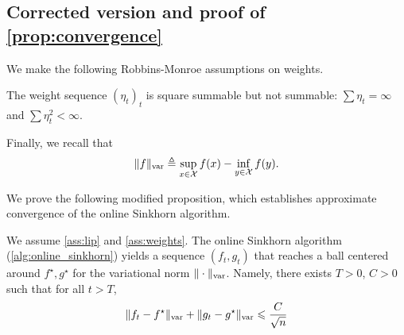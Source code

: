 \subsection{Corrected version and proof of \autoref{prop:convergence}}

\makeatletter
\newcommand{\setpropositiontag}[1]{%
  \let\oldtheproposition\theproposition%
  \renewcommand{\theproposition}{#1}%
  \g@addto@macro\endproposition{%
    \addtocounter{proposition}{-1}%
    \global\let\theproposition\oldtheproposition}%
  }
\makeatother

We make the following Robbins-Monroe assumptions on weights.
\begin{assumption}\label{ass:weights}
    The weight sequence ${(\eta_t)}_t$ is square summable but not summable: 
    $\sum \eta_t = \infty$ and $\sum \eta_t^2 < \infty$.
\end{assumption}
Finally, we recall that
\begin{equation}
    \Vert f \Vert_{\text{\upshape var}} \triangleq \sup_{x \in \mathcal{X}} f(x) - \inf_{y \in \mathcal{X}} f(y).
\end{equation}

We prove the following modified proposition, which establishes approximate
convergence of the online Sinkhorn algorithm.

\setpropositiontag{4 bis}
\begin{proposition}\label{prop:convergence_bis}
    We assume \autoref{ass:lip} and \ref{ass:weights}. The online Sinkhorn algorithm (\autoref{alg:online_sinkhorn}) yields a sequence $(f_t, g_t)$ that reaches a
    ball centered around $f^\star, g^\star$ for the variational norm $\Vert
    \cdot \Vert_{\text{\upshape var}}$. Namely, there exists $T > 0$, $C > 0$ such that for all $t > T$,
    \begin{equation}
        \Vert f_t - f^\star \Vert_{\text{\upshape var}}
        + \Vert g_t - g^\star \Vert_{\text{\upshape var}} \leqslant \frac{C}{\sqrt{n}} 
    \end{equation}
\end{proposition}

